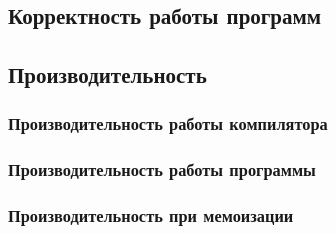     \subsection{Корректность работы программ}
    \subsection{Производительность}
        \subsubsection{Производительность работы компилятора}
        \subsubsection{Производительность работы программы}
        \subsubsection{Производительность при мемоизации}
